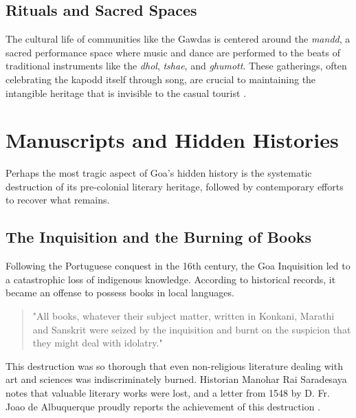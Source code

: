\documentclass[12pt,a4paper]{article}
\begin{document}
\subsection{Rituals and Sacred Spaces}
The cultural life of communities like the Gawdas is centered around the \textit{mandd}, a sacred performance space where music and dance are performed to the beats of traditional instruments like the \textit{dhol}, \textit{tshae}, and \textit{ghumott}. These gatherings, often celebrating the kapodd itself through song, are crucial to maintaining the intangible heritage that is invisible to the casual tourist \cite{Sardessai2022}.

\section{Manuscripts and Hidden Histories}
Perhaps the most tragic aspect of Goa's hidden history is the systematic destruction of its pre-colonial literary heritage, followed by contemporary efforts to recover what remains.

\subsection{The Inquisition and the Burning of Books}
Following the Portuguese conquest in the 16th century, the Goa Inquisition led to a catastrophic loss of indigenous knowledge. According to historical records, it became an offense to possess books in local languages.
\begin{quote}
    "All books, whatever their subject matter, written in Konkani, Marathi and Sanskrit were seized by the inquisition and burnt on the suspicion that they might deal with idolatry." \cite{Wikimedia2025}
\end{quote}
This destruction was so thorough that even non-religious literature dealing with art and sciences was indiscriminately burned. Historian Manohar Rai Saradesaya notes that valuable literary works were lost, and a letter from 1548 by D. Fr. Joao de Albuquerque proudly reports the achievement of this destruction \cite{Wikimedia2025}.
\end{document}
